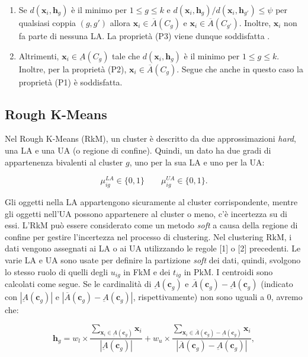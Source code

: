 \documentclass[12pt]{article}
\begin{document}
\begin{enumerate}
	\item Se $d(\mathbf{x}_i, \mathbf{h}_g)$ è il minimo per $1 \leq g \leq k$ e $d(\mathbf{x}_i, \mathbf{h}_g) / d(\mathbf{x}_i, \mathbf{h}_{g'}) \leq \psi$ per qualsiasi coppia $(g, g')$ allora $\mathbf{x}_i \in \overline{A}(C_g)$ e $\mathbf{x}_i \in \overline{A}(C_{g'})$. Inoltre, $\mathbf{x}_i$ non fa parte di nessuna LA. La proprietà (P3) viene dunque soddisfatta .\label{itm:rule1}
	
	\item Altrimenti, $\mathbf{x}_i \in \underbar{A}(C_g)$ tale che $d(\mathbf{x}_i, \mathbf{h}_g)$ è il minimo per $1 \leq g \leq k$. Inoltre, per la proprietà (P2), $\mathbf{x}_i \in \overline{A}(C_{g})$. Segue che anche in questo caso la proprietà (P1) è soddisfatta.\label{itm:rule2}
\end{enumerate}

\subsection{Rough K-Means}

Nel Rough K-Means (RkM), un cluster è descritto da due approssimazioni \textit{hard}, una LA e una UA (o regione di confine). Quindi, un dato ha due gradi di appartenenza bivalenti al cluster $g$, uno per la sua LA e uno per la UA:

$$\mu_{ig}^{LA} \in \{0,1\} \qquad \mu_{ig}^{UA} \in \{0,1\}.$$

Gli oggetti nella LA appartengono sicuramente al cluster corrispondente, mentre gli oggetti nell'UA possono appartenere al cluster o meno, c'è incertezza su di essi. L'RkM può essere considerato come un metodo \textit{soft} a causa della regione di confine per gestire l'incertezza nel processo di clustering. Nel clustering RkM, i dati vengono assegnati ai LA o ai UA utilizzando le regole [1] o [2] precedenti. Le varie LA e UA sono usate per definire la partizione \textit{soft} dei dati, quindi, svolgono lo stesso ruolo di quelli degli $u_{ig}$ in FkM e dei $t_{ig}$ in PkM. I centroidi sono calcolati come segue. Se le cardinalità di $\underbar{A}(\mathbf{c}_g)$ e $\overline{A}(\mathbf{c}_{g})-\underbar{A}(\mathbf{c}_g)$ (indicato con $|\underbar{A}(\mathbf{c}_g)|$ e $|\overline{A}(\mathbf{c}_{g})-\underbar{A}(\mathbf{c}_g)|$, rispettivamente) non sono uguali a 0, avremo che:

\begin{equation}
	\mathbf{h}_g = w_l \times \frac{\sum_{\mathbf{x}_i \in \underbar{A}(\mathbf{c}_g)} \mathbf{x}_i}{|\underbar{A}(\mathbf{c}_g)|} + w_u \times \frac{\sum_{\mathbf{x}_i \in \overline{A}(\mathbf{c}_{g})-\underbar{A}(\mathbf{c}_g)} \mathbf{x}_i}{|\overline{A}(\mathbf{c}_{g})-\underbar{A}(\mathbf{c}_g)|},
	\label{eq:10}
\end{equation}
\end{document}
